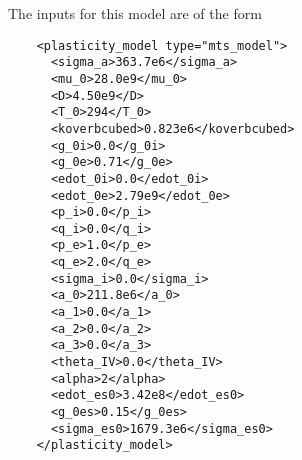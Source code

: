   The inputs for this model are of the form
  \lstset{language=XML}
  \begin{lstlisting}
    <plasticity_model type="mts_model">
      <sigma_a>363.7e6</sigma_a>
      <mu_0>28.0e9</mu_0>
      <D>4.50e9</D>
      <T_0>294</T_0>
      <koverbcubed>0.823e6</koverbcubed>
      <g_0i>0.0</g_0i>
      <g_0e>0.71</g_0e>
      <edot_0i>0.0</edot_0i>
      <edot_0e>2.79e9</edot_0e>
      <p_i>0.0</p_i>
      <q_i>0.0</q_i>
      <p_e>1.0</p_e>
      <q_e>2.0</q_e>
      <sigma_i>0.0</sigma_i>
      <a_0>211.8e6</a_0>
      <a_1>0.0</a_1>
      <a_2>0.0</a_2>
      <a_3>0.0</a_3>
      <theta_IV>0.0</theta_IV>
      <alpha>2</alpha>
      <edot_es0>3.42e8</edot_es0>
      <g_0es>0.15</g_0es>
      <sigma_es0>1679.3e6</sigma_es0>
    </plasticity_model>
  \end{lstlisting}

